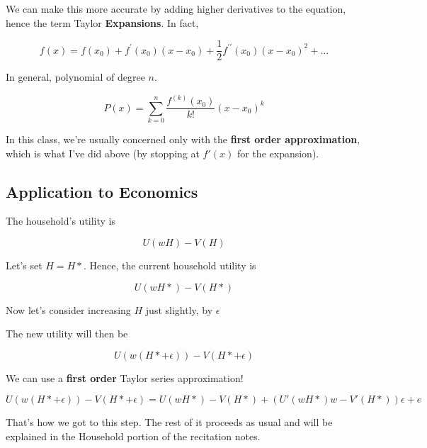 \documentclass[11pt]{scrartcl}
\begin{document}
We can make this more accurate by adding higher derivatives to the equation, hence the term Taylor \textbf{Expansions}. In fact,

\[ f(x)=f(x_{0})+f^{\prime }(x_{0})(x-x_{0})+\frac{1}{2}f^{\prime \prime}(x_{0})(x-x_{0})^{2}+... \]

In general, polynomial of degree $n$.

\[P(x)=\sum_{k=0}^n \frac{f^{(k)}(x_{0})}{k!} (x-x_0)^k \]

In this class, we're usually concerned only with the \textbf{first order approximation}, which is what I've did above (by stopping at $f\prime(x)$ for the expansion).

\subsection{Application to Economics}

The household's utility is

\[U(wH) - V(H)\]

Let's set $H = H*$. Hence, the current household utility is

\[U(wH*) - V(H*)\]

Now let's consider increasing $H$ just slightly, by $\epsilon$

The new utility will then be

\[U(w(H*+\epsilon)) - V(H*+\epsilon) \]

We can use a \textbf{first order} Taylor series approximation!

\[ U(w(H*+\epsilon)) - V(H*+\epsilon) = U(wH*) - V(H*) + (U\prime (wH*)w - V\prime(H*))\epsilon + e\]

That's how we got to this step. The rest of it proceeds as usual and will be explained in the Household portion of the recitation notes.
\end{document}
